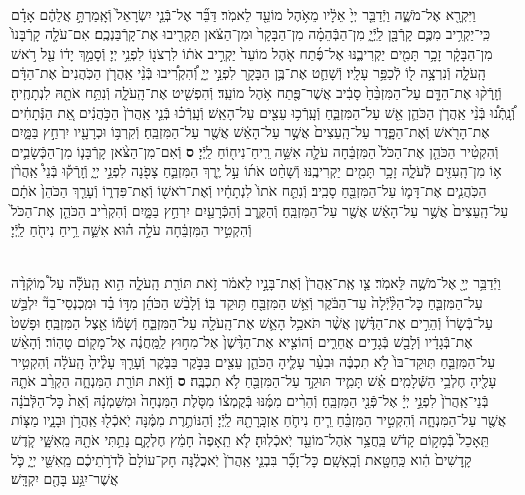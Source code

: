 \documentclass[twoside, openany, parskip=half, 11pt]{book}
\begin{document}
\begin{footnotesize}
\begin{multicols}{2}
\\
וַיִּקְרָ֖א אֶל־מֹשֶׁ֑ה וַיְֿדַבֵּ֤ר יְיָ֙ אֵלָ֔יו מֵאֹ֥הֶל מוֹעֵ֖ד לֵאמֹֽר׃ דַּבֵּ֞ר אֶל־בְּֿנֵ֤י יִשְׂרָאֵל֙ וְֿאָֽמַרְתָּ֣ אֲלֵהֶ֔ם אָדָ֗ם כִּֽי־יַקְרִ֥יב מִכֶּ֛ם קָרְֿבָּ֖ן לַֽיְֿיָ֑ מִן־הַבְּֿהֵמָ֗ה מִן־הַבָּקָר֙ וּמִן־הַצֹּ֔אן תַּקְרִ֖יבוּ אֶת־קָרְֿבַּנְכֶֽם׃ אִם־עֹלָ֤ה קָרְֿבָּנוֹ֙ מִן־הַבָּקָ֔ר זָכָ֥ר תָּמִ֖ים יַקְרִיבֶ֑נּוּ אֶל־פֶּ֜תַח אֹ֤הֶל מוֹעֵד֙ יַקְרִ֣יב אֹת֔וֹ לִרְצֹנ֖וֹ לִפְנֵ֥י יְיָ׃
וְֿסָמַ֣ךְ יָד֔וֹ עַ֖ל רֹ֣אשׁ הָֽעֹלָ֑ה וְֿנִרְצָ֥ה ל֖וֹ לְֿכַפֵּ֥ר עָלָֽיו׃
וְֿשָׁחַ֛ט אֶת־בֶּ֥ן הַבָּקָ֖ר לִפְנֵ֣י יְיָ֑ וְֿ֠הִקְרִ֠יבוּ בְּֿנֵ֨י אַֽהֲרֹ֤ן הַכֹּֽהֲנִים֙ אֶת־הַדָּ֔ם וְֿזָֽרְֿק֨וּ אֶת־הַדָּ֤ם עַל־הַמִּזְבֵּ֨חַ֙ סָבִ֔יב אֲשֶׁר־פֶּ֖תַח אֹ֥הֶל מוֹעֵֽד׃ וְֿהִפְשִׁ֖יט אֶת־הָֽעֹלָ֑ה וְֿנִתַּ֥ח אֹתָ֖הּ לִנְתָחֶֽיהָ׃ וְֿ֠נָֽתְֿנ֠וּ בְּֿנֵ֨י אַֽהֲרֹ֧ן הַכֹּהֵ֛ן אֵ֖שׁ עַל־הַמִּזְבֵּ֑חַ וְֿעָֽרְֿכ֥וּ עֵצִ֖ים עַל־הָאֵֽשׁ׃ וְֿעָֽרְֿכ֗וּ בְּֿנֵ֤י אַֽהֲרֹן֙ הַכֹּ֣הֲנִ֔ים אֵ֚ת הַנְּֿתָחִ֔ים אֶת־הָרֹ֖אשׁ וְֿאֶת־הַפָּ֑דֶר עַל־הָֽעֵצִים֙ אֲשֶׁ֣ר עַל־הָאֵ֔שׁ אֲשֶׁ֖ר עַל־הַמִּזְבֵּֽחַ׃ וְֿקִרְבּ֥וֹ וּכְרָעָ֖יו יִרְחַ֣ץ בַּמָּ֑יִם וְֿהִקְטִ֨יר הַכֹּהֵ֤ן אֶת־הַכֹּל֙ הַמִּזְבֵּ֔חָה עֹלָ֛ה אִשֵּׁ֥ה רֵֽיחַ־נִיח֖וֹחַ לַֽיְֿיָ׃ \textbf{ס}  וְֿאִם־מִן־הַצֹּ֨אן קָרְֿבָּנ֧וֹ מִן־הַכְּֿשָׂבִ֛ים א֥וֹ מִן־הָֽעִזִּ֖ים לְֿעֹלָ֑ה זָכָ֥ר תָּמִ֖ים יַקְרִיבֶֽנּוּ׃ וְֿשָׁחַ֨ט אֹת֜וֹ עַ֣ל יֶ֧רֶךְ הַמִּזְבֵּ֛חַ צָפֹ֖נָה לִפְנֵ֣י יְיָ֑ וְֿזָֽרְֿק֡וּ בְּֿנֵי֩ אַֽהֲרֹ֨ן הַכֹּֽהֲנִ֧ים אֶת־דָּמ֛וֹ עַל־הַמִּזְבֵּ֖חַ סָבִֽיב׃ וְֿנִתַּ֤ח אֹתוֹ֙ לִנְתָחָ֔יו וְֿאֶת־רֹאשׁ֖וֹ וְֿאֶת־פִּדְר֑וֹ וְֿעָרַ֤ךְ הַכֹּהֵן֙ אֹתָ֔ם עַל־הָֽעֵצִים֙ אֲשֶׁ֣ר עַל־הָאֵ֔שׁ אֲשֶׁ֖ר עַל־הַמִּזְבֵּֽחַ׃ וְֿהַקֶּ֥רֶב וְֿהַכְּֿרָעַ֖יִם יִרְחַ֣ץ בַּמָּ֑יִם וְֿהִקְרִ֨יב הַכֹּהֵ֤ן אֶת־הַכֹּל֙ וְֿהִקְטִ֣יר הַמִּזְבֵּ֔חָה עֹלָ֣ה ה֗וּא אִשֵּׁ֛ה רֵ֥יחַ נִיחֹ֖חַ לַֽיְֿיָ׃

\\
וַיְֿדַבֵּ֥ר יְיָ֖ אֶל־מֹשֶׁ֥ה לֵּאמֹֽר׃ צַ֤ו אֶֽת־אַֽהֲרֹן֙ וְֿאֶת־בָּנָ֣יו לֵאמֹ֔ר זֹ֥את תּוֹרַ֖ת הָֽעֹלָ֑ה הִ֣וא הָֽעֹלָ֡ה עַל֩ מֽוֹקְֿדָ֨ה עַל־הַמִּזְבֵּ֤חַ כׇּל־הַלַּ֨יְֿלָה֙ עַד־הַבֹּ֔קֶר וְֿאֵ֥שׁ הַמִּזְבֵּ֖חַ תּ֥וּקַד בּֽוֹ׃ וְֿלָבַ֨שׁ הַכֹּהֵ֜ן מִדּ֣וֹ בַ֗ד וּמִֽכְנְסֵי־בַד֘ יִלְבַּ֣שׁ עַל־בְּֿשָׂרוֹ֒ וְֿהֵרִ֣ים אֶת־הַדֶּ֗שֶׁן אֲשֶׁ֨ר תֹּאכַ֥ל הָאֵ֛שׁ אֶת־הָֽעֹלָ֖ה עַל־הַמִּזְבֵּ֑חַ וְֿשָׂמ֕וֹ אֵ֖צֶל הַמִּזְבֵּֽחַ׃  וּפָשַׁט֙ אֶת־בְּֿגָדָ֔יו וְֿלָבַ֖שׁ בְּֿגָדִ֣ים אֲחֵרִ֑ים וְֿהוֹצִ֤יא אֶת־הַדֶּ֨שֶׁן֙ אֶל־מִח֣וּץ לַֽמַּֽחֲנֶ֔ה אֶל־מָק֖וֹם טָהֽוֹר׃ וְֿהָאֵ֨שׁ עַל־הַמִּזְבֵּ֤חַ תּֽוּקַד־בּוֹ֙ לֹ֣א תִכְבֶּ֔ה וּבִעֵ֨ר עָלֶ֧יהָ הַכֹּהֵ֛ן עֵצִ֖ים בַּבֹּ֣קֶר בַּבֹּ֑קֶר וְֿעָרַ֤ךְ עָלֶ֨יהָ֙ הָֽעֹלָ֔ה וְֿהִקְטִ֥יר עָלֶ֖יהָ חֶלְבֵ֥י הַשְּֿׁלָמִֽים׃ אֵ֗שׁ תָּמִ֛יד תּוּקַ֥ד עַל־הַמִּזְבֵּ֖חַ לֹ֥א תִכְבֶּֽה׃ \textbf{ס}  וְֿזֹ֥את תּוֹרַ֖ת הַמִּנְחָ֑ה הַקְרֵ֨ב אֹתָ֤הּ בְּֿנֵי־אַֽהֲרֹן֙ לִפְנֵ֣י יְיָ֔ אֶל־פְּֿנֵ֖י הַמִּזְבֵּֽחַ׃ וְֿהֵרִ֨ים מִמֶּ֜נּוּ בְּֿקֻמְצ֗וֹ מִסֹּ֤לֶת הַמִּנְחָה֙ וּמִשַּׁמְנָ֔הּ וְֿאֵת֙ כׇּל־הַלְּֿבֹנָ֔ה אֲשֶׁ֖ר עַל־הַמִּנְחָ֑ה וְֿהִקְטִ֣יר הַמִּזְבֵּ֗חַ רֵ֧יחַ נִיחֹ֛חַ אַזְכָּֽרָתָ֖הּ לַֽיְֿיָ׃ וְֿהַנּוֹתֶ֣רֶת מִמֶּ֔נָּה יֹֽאכְֿל֖וּ אַֽהֲרֹ֣ן וּבָנָ֑יו מַצּ֤וֹת תֵּֽאָכֵל֙ בְּֿמָק֣וֹם קָדֹ֔שׁ בַּֽחֲצַ֥ר אֹֽהֶל־מוֹעֵ֖ד יֹֽאכְֿלֽוּהָ׃ לֹ֤א תֵֽאָפֶה֙ חָמֵ֔ץ חֶלְקָ֛ם נָתַ֥תִּי אֹתָ֖הּ מֵֽאִשָּׁ֑י קֹ֤דֶשׁ קָֽדָשִׁים֙ הִ֔וא כַּֽחַטָּ֖את וְֿכָֽאָשָֽׁם׃ כׇּל־זָכָ֞ר בִּבְנֵ֤י אַֽהֲרֹן֙ יֹֽאכֲלֶ֔נָּה חָק־עוֹלָם֙ לְֿדֹרֹ֣תֵיכֶ֔ם מֵֽאִשֵּׁ֖י יְיָ֑ כֹּ֛ל אֲשֶׁר־יִגַּ֥ע בָּהֶ֖ם יִקְדָּֽשׁ׃


\end{multicols}
\end{footnotesize}
\end{document}
